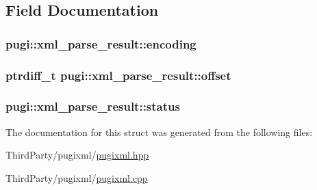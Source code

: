 \subsection{Field Documentation}
\hypertarget{structpugi_1_1xml__parse__result_ad11f279dfce644dfe297e24dc5f72c01}{
\subsubsection[{encoding}]{ pugi\-::xml\-\_\-parse\-\_\-result\-::encoding}}\label{structpugi_1_1xml__parse__result_ad11f279dfce644dfe297e24dc5f72c01}
\hypertarget{structpugi_1_1xml__parse__result_adb61df40459ba6fb1083d22467983086}{
\subsubsection[{offset}]{\setlength{\rightskip}{0pt plus 5cm}ptrdiff\-\_\-t pugi\-::xml\-\_\-parse\-\_\-result\-::offset}}\label{structpugi_1_1xml__parse__result_adb61df40459ba6fb1083d22467983086}
\hypertarget{structpugi_1_1xml__parse__result_af8b3e6badea671931017695c8a9dd1af}{
\subsubsection[{status}]{ pugi\-::xml\-\_\-parse\-\_\-result\-::status}}\label{structpugi_1_1xml__parse__result_af8b3e6badea671931017695c8a9dd1af}


The documentation for this struct was generated from the following files\-:\begin{DoxyCompactItemize}
\item 
Third\-Party/pugixml/\hyperlink{pugixml_8hpp}{pugixml.\-hpp}\item 
Third\-Party/pugixml/\hyperlink{pugixml_8cpp}{pugixml.\-cpp}\end{DoxyCompactItemize}
